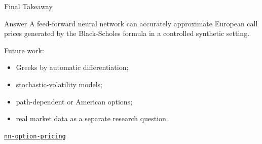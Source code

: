 \documentclass[10pt,aspectratio=43]{beamer}
\newcommand{\projectrepo}{\href{https://github.com/matteogiorgi/nn-option-pricing}{\faGithub\hspace{0.35em}\texttt{nn-option-pricing}}}
\begin{document}
\begin{frame}{Final Takeaway}
    \begin{block}{Answer}
        A feed-forward neural network can accurately approximate European call prices generated by the Black-Scholes formula in a controlled synthetic setting.
    \end{block}

    \vspace{0.3em}
    Future work:
    \begin{itemize}
        \item Greeks by automatic differentiation;
        \item stochastic-volatility models;
        \item path-dependent or American options;
        \item real market data as a separate research question.
    \end{itemize}

    \vfill
    \centering
    {\footnotesize\color{projectorange}\projectrepo}
\end{frame}
\end{document}
